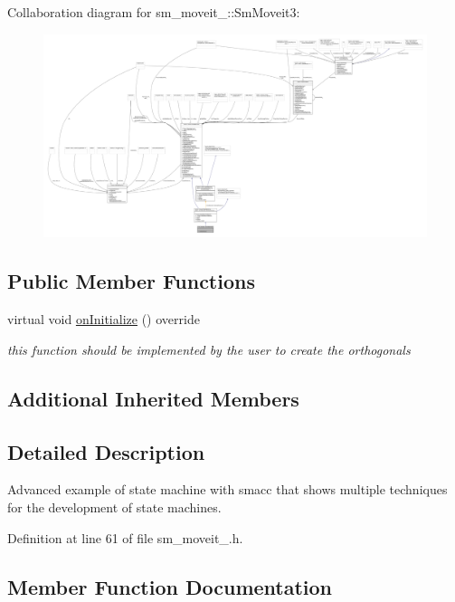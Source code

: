 Collaboration diagram for sm\+\_\+moveit\+\_\+:\+:Sm\+Moveit3\+:
\nopagebreak
\begin{figure}[H]
\begin{center}
\leavevmode
\includegraphics[width=350pt]{structsm__moveit__3_1_1SmMoveit3__coll__graph}
\end{center}
\end{figure}
\subsection*{Public Member Functions}
\begin{DoxyCompactItemize}
\item 
virtual void \hyperlink{structsm__moveit__3_1_1SmMoveit3_afc1eae2ab78a27cd88d642b762501208}{on\+Initialize} () override
\begin{DoxyCompactList}\small\item\em this function should be implemented by the user to create the orthogonals \end{DoxyCompactList}\end{DoxyCompactItemize}
\subsection*{Additional Inherited Members}


\subsection{Detailed Description}
Advanced example of state machine with smacc that shows multiple techniques for the development of state machines. 

Definition at line 61 of file sm\+\_\+moveit\+\_.\+h.



\subsection{Member Function Documentation}
\mbox{\label{structsm__moveit__3_1_1SmMoveit3_afc1eae2ab78a27cd88d642b762501208}} 
